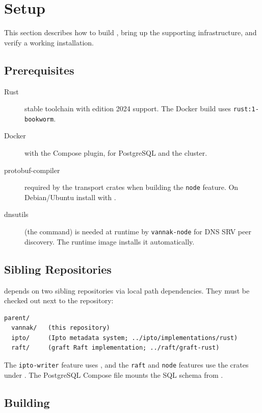\section{Setup}
\label{sec:setup}

This section describes how to build \vannak{}, bring up the supporting
infrastructure, and verify a working installation.

\subsection{Prerequisites}

\begin{description}
\item[Rust] stable toolchain with edition 2024 support. The Docker build uses
  \texttt{rust:1-bookworm}.
\item[Docker] with the Compose plugin, for PostgreSQL and the \raft{} cluster.
\item[protobuf-compiler] required by the \graft{} transport crates when
  building the \texttt{node} feature. On Debian/Ubuntu install with
  .
\item[dnsutils] (the  command) is needed at runtime by
  \texttt{vannak-node} for DNS SRV peer discovery. The runtime image installs
  it automatically.
\end{description}

\subsection{Sibling Repositories}

\vannak{} depends on two sibling repositories via local path dependencies. They
must be checked out next to the \vannak{} repository:

\begin{lstlisting}[numbers=none]
parent/
  vannak/   (this repository)
  ipto/     (Ipto metadata system; ../ipto/implementations/rust)
  raft/     (graft Raft implementation; ../raft/graft-rust)
\end{lstlisting}

The \texttt{ipto-writer} feature uses ,
and the \texttt{raft} and \texttt{node} features use the crates under
. The PostgreSQL Compose file mounts the \ipto{}
SQL schema from .

\subsection{Building}

